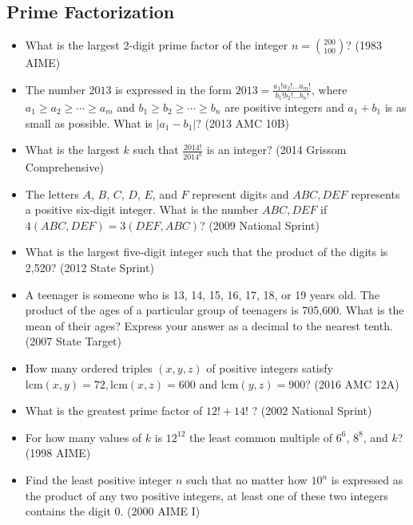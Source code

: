 \documentclass{article}
\begin{document}
\subsection{Prime Factorization}

\begin{itemize}

\item What is the largest 2-digit prime factor of the integer $n=\binom{200}{100}$? (1983 AIME)

\item The number $2013$ is expressed in the form $2013 = \frac {a_1!a_2!...a_m!}{b_1!b_2!...b_n!}$, where $a_1 \ge a_2 \ge \cdots \ge a_m$ and $b_1 \ge b_2 \ge \cdots \ge b_n$ are positive integers and $a_1 + b_1$ is as small as possible. What is $|a_1 - b_1|$? (2013 AMC 10B)

\item What is the largest $k$ such that $\frac{2014!}{2014^k}$ is an integer? (2014 Grissom Comprehensive)

\item The letters $A$, $B$, $C$, $D$, $E$, and $F$ represent digits and $ABC,DEF$ represents a positive six-digit integer. What is the number $ABC,DEF$ if $4(ABC,DEF)=3(DEF,ABC)$? (2009 National Sprint)

\item What is the largest five-digit integer such that the product of the digits is 2,520? (2012 State Sprint)

\item A teenager is someone who is 13, 14, 15, 16, 17, 18, or 19 years old. The product of the ages of a particular group of teenagers is 705,600. What is the mean of their ages? Express your answer as a decimal to the nearest tenth. (2007 State Target)

\item How many ordered triples $(x,y,z)$ of positive integers satisfy $\text{lcm}(x,y) = 72, \text{lcm}(x,z) = 600$ and $\text{lcm}(y,z)=900$? (2016 AMC 12A)

\item What is the greatest prime factor of $12!+14!$ ? (2002 National Sprint)


%
\item For how many values of $k$ is $12^{12}$ the least common multiple of $6^6$, $8^8$, and $k$? (1998 AIME)

\item Find the least positive integer $n$ such that no matter how $10^{n}$ is expressed as the product of any two positive integers, at least one of these two integers contains the digit $0$. (2000 AIME I)


\end{itemize}
\end{document}
